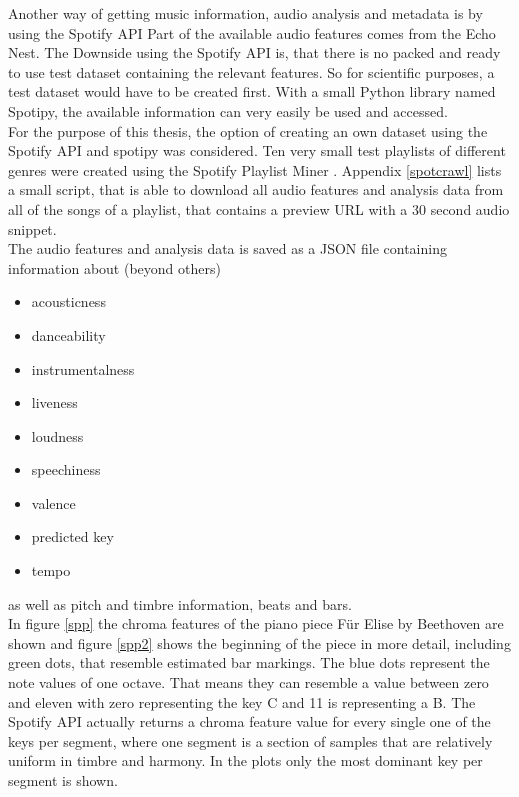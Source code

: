 Another way of getting music information, audio analysis and metadata is by using the Spotify API\cite{spotifyapi1}
Part of the available audio features comes from the Echo Nest\cite{echonest1}.
The Downside using the Spotify API is, that there is no packed and ready to use test dataset containing the relevant features. So for scientific purposes, a test dataset would have to be created first. With a small Python library named Spotipy, the available information can very easily be used and accessed. \cite{spotipy1}\\
For the purpose of this thesis, the option of creating an own dataset using the Spotify API and spotipy was considered. 
Ten very small test playlists of different genres were created using the Spotify Playlist Miner \cite{spotmin1}. 
Appendix \ref{spotcrawl} lists a small script, that is able to download all audio features and analysis data from all of the songs of a playlist, that contains a preview URL with a 30 second audio snippet.\\
The audio features and analysis data is saved as a JSON file containing information about (beyond others)
\begin{itemize}
	\setlength\itemsep{0em}
	\item acousticness
	\item danceability
	\item instrumentalness
	\item liveness
	\item loudness
	\item speechiness
	\item valence
	\item predicted key
	\item tempo 
\end{itemize}
as well as pitch and timbre information, beats and bars.\\
In figure \ref{spp} the chroma features of the piano piece Für Elise by Beethoven are shown and figure \ref{spp2} shows the beginning of the piece in more detail, including green dots, that resemble estimated bar markings. The blue dots represent the note values of one octave. That means they can resemble a value between zero and eleven with zero representing the key C and 11 is representing a B.
The Spotify API actually returns a chroma feature value for every single one of the keys per segment, where one segment is a section of samples that are relatively uniform in timbre and harmony. In the plots only the most dominant key per segment is shown. 
